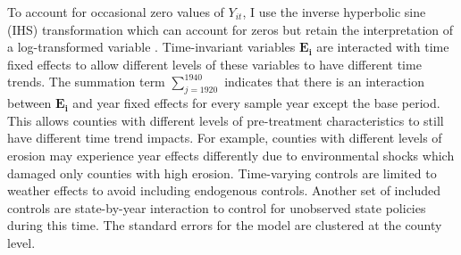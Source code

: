 \documentclass[12pt]{article}
\begin{document}
 To account for occasional zero values of \textit{$Y_{it}$}, I use the inverse hyperbolic sine (IHS) transformation which can account for zeros but retain the interpretation of a log-transformed variable \citep{bellemare_elasticities_2020}. 
 Time-invariant variables \textbf{$\mathbf{E_i}$} are interacted with time fixed effects to allow different levels of these variables to have different time trends.
 The summation term $\sum^{1940}_{j=1920}$ indicates that there is an interaction between \textbf{$\mathbf{E_i}$} and year fixed effects for every sample year except the base period.
 This allows counties with different levels of pre-treatment characteristics to still have different time trend impacts.
 For example, counties with different levels of erosion may experience year effects differently due to environmental shocks which damaged only counties with high erosion.
Time-varying controls are limited to weather effects to avoid including endogenous controls.
Another set of included controls are state-by-year interaction to control for unobserved state policies during this time.
The standard errors for the model are clustered at the county level.
\end{document}
